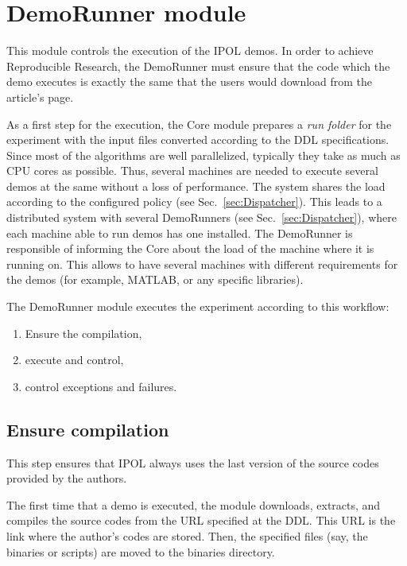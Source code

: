 \section{DemoRunner module}
\label{sec:DemoRunner}
This module controls the execution of the IPOL demos. In order to achieve Reproducible Research, the DemoRunner must ensure that the code which the demo executes is exactly the same that the users would download from the article's page.

As a first step for the execution, the Core module prepares a \emph{run folder} for the experiment with the input files converted according to the DDL specifications. Since most of the algorithms are well parallelized, typically they take as much as CPU cores as possible. Thus, several machines are needed to execute several demos at the same without a loss of performance. The system shares the load according to the configured policy (see Sec.~\ref{sec:Dispatcher}). This leads to a distributed system with several DemoRunners (see Sec.~\ref{sec:Dispatcher}), where each machine able to run demos has one installed. The DemoRunner is responsible of informing the Core about the load of the machine where it is running on. This allows to have several machines with different requirements for the demos (for example, MATLAB, or any specific libraries).

The DemoRunner module executes the experiment according to this workflow:

\begin{enumerate}
    \item Ensure the compilation,
    \item execute and control,
    \item control exceptions and failures. 
\end{enumerate}

\subsection{Ensure compilation}
\noindent

This step ensures that IPOL always uses the last version of the source codes provided by the authors. 

The first time that a demo is executed, the module downloads, extracts, and compiles the source codes from the URL specified at the DDL. This URL is the link where the author's codes are stored. Then, the specified files (say, the binaries or scripts) are moved to the binaries directory.

